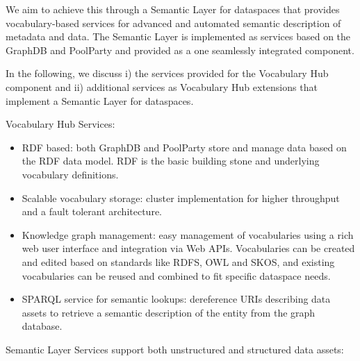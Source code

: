 \documentclass[
  super,
  preprint,
  3p]{elsarticle}
\providecommand{\tightlist}{%
  \setlength{\itemsep}{0pt}\setlength{\parskip}{0pt}}\usepackage{longtable,booktabs,array}
\begin{document}
We aim to achieve this through a Semantic Layer for dataspaces that
provides vocabulary-based services for advanced and automated semantic
description of metadata and data. The Semantic Layer is implemented as
services based on the GraphDB and PoolParty and provided as a one
seamlessly integrated component.

In the following, we discuss i) the services provided for the Vocabulary
Hub component and ii) additional services as Vocabulary Hub extensions
that implement a Semantic Layer for dataspaces.

Vocabulary Hub Services:

\begin{itemize}
\tightlist
\item
  RDF based: both GraphDB and PoolParty store and manage data based on
  the RDF data model. RDF is the basic building stone and underlying
  vocabulary definitions.
\item
  Scalable vocabulary storage: cluster implementation for higher
  throughput and a fault tolerant architecture.
\item
  Knowledge graph management: easy management of vocabularies using a
  rich web user interface and integration via Web APIs. Vocabularies can
  be created and edited based on standards like RDFS, OWL and SKOS, and
  existing vocabularies can be reused and combined to fit specific
  dataspace needs.
\item
  SPARQL service for semantic lookups: dereference URIs describing data
  assets to retrieve a semantic description of the entity from the graph
  database.
\end{itemize}

Semantic Layer Services support both unstructured and structured data
assets:
\end{document}
